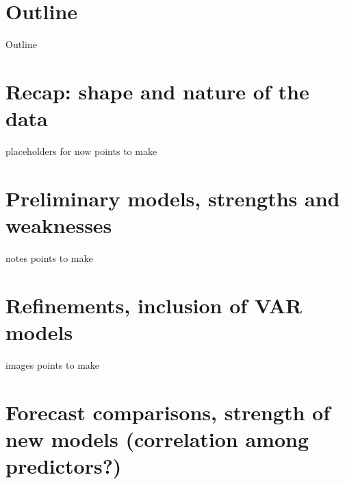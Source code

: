 \documentclass[ignorenonframetext]{beamer}
\begin{document}
\begin{frame}
	\titlepage
\end{frame}


	\section*{Outline}
	\begin{frame}{Outline}
		\tableofcontents
	\end{frame}
	
\section{Recap: shape and nature of the data}

  	\begin{frame}{placeholders for now}
  		points to make
  	\end{frame}
 
 \section{Preliminary models, strengths and weaknesses}
 
  	\begin{frame}{notes}
  		points to make
  	\end{frame}
 
 
 \section{Refinements, inclusion of VAR models}
 
  	\begin{frame}{images}
  		points to make
  	\end{frame}
 
 
 \section{Forecast comparisons, strength of new models (correlation among predictors?)}
 
\end{document}

